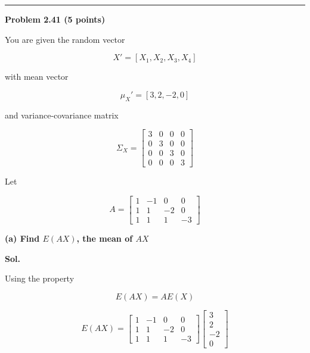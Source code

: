 \documentclass[12pt]{article}
\begin{document}
\vspace{1cm}

\hrule

\vspace{0.7cm}

\noindent
\textbf{Problem 2.41 (5 points)}

\vspace{0.5cm}

\noindent
You are given the random vector

\[
X'
=
[X_1,X_2,X_3,X_4]
\]

\noindent
with mean vector

\[
\mu_X'
=
[3,2,-2,0]
\]

\noindent
and variance-covariance matrix

\[
\Sigma_X
=
\begin{bmatrix}
3 & 0 & 0 & 0\\
0 & 3 & 0 & 0\\
0 & 0 & 3 & 0\\
0 & 0 & 0 & 3
\end{bmatrix}
\]

\noindent
Let

\[
A
=
\begin{bmatrix}
1 & -1 & 0 & 0\\
1 & 1 & -2 & 0\\
1 & 1 & 1 & -3
\end{bmatrix}
\]

\vspace{0.5cm}

\noindent
\textbf{(a) Find \(E(AX)\), the mean of \(AX\)}

\vspace{0.5cm}

\noindent
\textbf{Sol.}

\vspace{0.3cm}

\noindent
Using the property

\[
E(AX)
=
AE(X)
\]

\[
E(AX)
=
\begin{bmatrix}
1 & -1 & 0 & 0\\
1 & 1 & -2 & 0\\
1 & 1 & 1 & -3
\end{bmatrix}
\begin{bmatrix}
3\\
2\\
-2\\
0
\end{bmatrix}
\]
\end{document}
